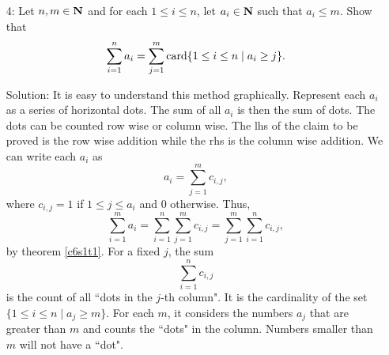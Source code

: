\begin{enumerate}
\item[4:] Let $n, m \in \mathbf{N}$ and for each $1 \le i \le n$, let $a_i \in 
\mathbf{N}$ such that $a_i \le m$. Show that
\[
\sum_{i=1}^n a_i = \sum_{j=1}^m \operatorname{card}\{1 \le i \le n \;|\; a_i \ge j\}.
\]
\item[Solution:] It is easy to understand this method graphically. 
Represent each $a_i$ as a series of horizontal dots. The sum of all $a_i$
is then the sum of dots. The dots can be counted row wise or column wise.
The lhs of the claim to be proved is the row wise addition while the rhs
is the column wise addition. We can write each $a_i$ as
\[
a_i = \sum_{j = 1}^m c_{i, j},
\]
where $c_{i, j} = 1$ if $1 \le j \le a_i$ and $0$ otherwise. Thus,
\[
\sum_{i=1}^m a_i = \sum_{i=1}^n \sum_{j=1}^m c_{i, j} = 
\sum_{j=1}^m \sum_{i=1}^n c_{i, j},
\]
by theorem \ref{c6s1t1}. For a fixed $j$, the sum
\[
\sum_{i=1}^n c_{i, j}
\]
is the count of all ``dots in the $j$-th column". It is the cardinality
of the set $\{1 \le i \le n \;|\; a_j \ge m\}$. For each $m$, it considers
the numbers $a_j$ that are greater than $m$ and counts the ``dots" in the
column. Numbers smaller than $m$ will not have a ``dot".
\end{enumerate}

